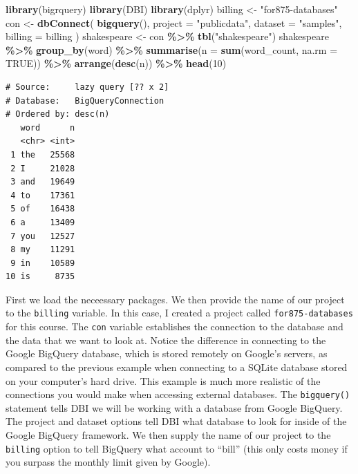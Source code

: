 \documentclass[
]{krantz}
\makeatletter
\newenvironment{Shaded}{\begin{snugshade}}{\end{snugshade}}
\newcommand{\DataTypeTok}[1]{\textcolor[rgb]{0.27,0.27,0.27}{#1}}
\newcommand{\DecValTok}[1]{\textcolor[rgb]{0.06,0.06,0.06}{#1}}
\newcommand{\KeywordTok}[1]{\textcolor[rgb]{0.27,0.27,0.27}{\textbf{#1}}}
\newcommand{\NormalTok}[1]{#1}
\newcommand{\OperatorTok}[1]{\textcolor[rgb]{0.43,0.43,0.43}{\textbf{#1}}}
\newcommand{\OtherTok}[1]{\textcolor[rgb]{0.37,0.37,0.37}{#1}}
\newcommand{\StringTok}[1]{\textcolor[rgb]{0.5,0.5,0.5}{#1}}
\newenvironment{kframe}{%
\medskip{}
\setlength{\fboxsep}{.8em}
 \def\at@end@of@kframe{}%
 \ifinner\ifhmode%
  \def\at@end@of@kframe{\end{minipage}}%
  \begin{minipage}{\columnwidth}%
 \fi\fi%
 \def\FrameCommand##1{\hskip\@totalleftmargin \hskip-\fboxsep
 \colorbox{shadecolor}{##1}\hskip-\fboxsep
     \hskip-\linewidth \hskip-\@totalleftmargin \hskip\columnwidth}%
 \MakeFramed {\advance\hsize-\width
   \@totalleftmargin\z@ \linewidth\hsize
   \@setminipage}}%
 {\par\unskip\endMakeFramed%
 \at@end@of@kframe}
\renewenvironment{Shaded}{\begin{kframe}}{\end{kframe}}
\makeatother
\begin{document}
\begin{Shaded}
\begin{Highlighting}[]
\KeywordTok{library}\NormalTok{(bigrquery)}
\KeywordTok{library}\NormalTok{(DBI)}
\KeywordTok{library}\NormalTok{(dplyr)}
\NormalTok{billing \textless{}{-}}\StringTok{ "for875{-}databases"}
\NormalTok{con \textless{}{-}}\StringTok{ }\KeywordTok{dbConnect}\NormalTok{(}
  \KeywordTok{bigquery}\NormalTok{(),}
  \DataTypeTok{project =} \StringTok{"publicdata"}\NormalTok{,}
  \DataTypeTok{dataset =} \StringTok{"samples"}\NormalTok{,}
  \DataTypeTok{billing =}\NormalTok{ billing}
\NormalTok{)}
\NormalTok{shakespeare \textless{}{-}}\StringTok{ }\NormalTok{con }\OperatorTok{\%\textgreater{}\%}
\StringTok{  }\KeywordTok{tbl}\NormalTok{(}\StringTok{"shakespeare"}\NormalTok{)}
\NormalTok{shakespeare }\OperatorTok{\%\textgreater{}\%}
\StringTok{  }\KeywordTok{group\_by}\NormalTok{(word) }\OperatorTok{\%\textgreater{}\%}
\StringTok{  }\KeywordTok{summarise}\NormalTok{(}\DataTypeTok{n =} \KeywordTok{sum}\NormalTok{(word\_count, }\DataTypeTok{na.rm =} \OtherTok{TRUE}\NormalTok{)) }\OperatorTok{\%\textgreater{}\%}
\StringTok{  }\KeywordTok{arrange}\NormalTok{(}\KeywordTok{desc}\NormalTok{(n)) }\OperatorTok{\%\textgreater{}\%}
\StringTok{  }\KeywordTok{head}\NormalTok{(}\DecValTok{10}\NormalTok{)}
\end{Highlighting}
\end{Shaded}

\begin{verbatim}
# Source:     lazy query [?? x 2]
# Database:   BigQueryConnection
# Ordered by: desc(n)
   word      n
   <chr> <int>
 1 the   25568
 2 I     21028
 3 and   19649
 4 to    17361
 5 of    16438
 6 a     13409
 7 you   12527
 8 my    11291
 9 in    10589
10 is     8735
\end{verbatim}

First we load the neceessary packages. We then provide the name of our project to the \texttt{billing} variable. In this case, I created a project called \texttt{for875-databases} for this course. The \texttt{con} variable establishes the connection to the database and the data that we want to look at. Notice the difference in connecting to the Google BigQuery database, which is stored remotely on Google's servers, as compared to the previous example when connecting to a SQLite database stored on your computer's hard drive. This example is much more realistic of the connections you would make when accessing external databases. The \texttt{bigquery()} statement tells DBI we will be working with a database from Google BigQuery. The project and dataset options tell DBI what database to look for inside of the Google BigQuery framework. We then supply the name of our project to the \texttt{billing} option to tell BigQuery what account to ``bill'' (this only costs money if you surpass the monthly limit given by Google).
\end{document}
